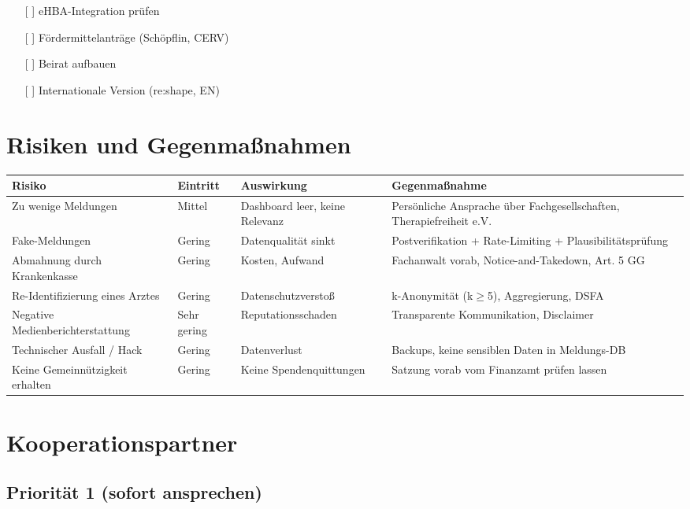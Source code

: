 \documentclass{umbruch-position}
\begin{document}
\begin{itemize}[nosep]
  \item [{[ ]}] eHBA-Integration prüfen
  \item [{[ ]}] Fördermittelanträge (Schöpflin, CERV)
  \item [{[ ]}] Beirat aufbauen
  \item [{[ ]}] Internationale Version (re:shape, EN)
\end{itemize}


\section{Risiken und Gegenmaßnahmen}

{\small
\begin{tabularx}{\textwidth}{X X X X}
\toprule
\textbf{Risiko} & \textbf{Eintritt} & \textbf{Auswirkung} & \textbf{Gegenmaßnahme} \\
\midrule
Zu wenige Meldungen & Mittel & Dashboard leer, keine Relevanz & Persönliche Ansprache über Fachgesellschaften, Therapiefreiheit e.V. \\
Fake-Meldungen & Gering & Datenqualität sinkt & Postverifikation + Rate-Limiting + Plausibilitätsprüfung \\
Abmahnung durch Krankenkasse & Gering & Kosten, Aufwand & Fachanwalt vorab, Notice-and-Takedown, Art. 5 GG \\
Re-Identifizierung eines Arztes & Gering & Datenschutzverstoß & k-Anonymität (k$\ge$5), Aggregierung, DSFA \\
Negative Medienberichterstattung & Sehr gering & Reputationsschaden & Transparente Kommunikation, Disclaimer \\
Technischer Ausfall / Hack & Gering & Datenverlust & Backups, keine sensiblen Daten in Meldungs-DB \\
Keine Gemeinnützigkeit erhalten & Gering & Keine Spendenquittungen & Satzung vorab vom Finanzamt prüfen lassen \\
\bottomrule
\end{tabularx}
}



\section{Kooperationspartner}

\subsection{Priorität 1 (sofort ansprechen)}
\end{document}

